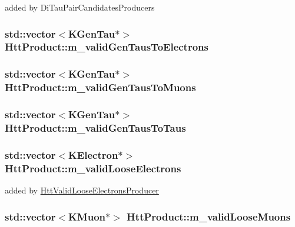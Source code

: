 added by DiTauPairCandidatesProducers \hypertarget{classHttProduct_a9b4abe266732576c4acebde25b49a9a0}{
\subsubsection[{m\_\-validGenTausToElectrons}]{\setlength{\rightskip}{0pt plus 5cm}std::vector$<$KGenTau$\ast$$>$ {\bf HttProduct::m\_\-validGenTausToElectrons}}}
\label{classHttProduct_a9b4abe266732576c4acebde25b49a9a0}
\hypertarget{classHttProduct_a0f0b0a177d96a0aaa051228061356033}{
\subsubsection[{m\_\-validGenTausToMuons}]{\setlength{\rightskip}{0pt plus 5cm}std::vector$<$KGenTau$\ast$$>$ {\bf HttProduct::m\_\-validGenTausToMuons}}}
\label{classHttProduct_a0f0b0a177d96a0aaa051228061356033}
\hypertarget{classHttProduct_abd8f9838618318dde76c1c98b6d00e0d}{
\subsubsection[{m\_\-validGenTausToTaus}]{\setlength{\rightskip}{0pt plus 5cm}std::vector$<$KGenTau$\ast$$>$ {\bf HttProduct::m\_\-validGenTausToTaus}}}
\label{classHttProduct_abd8f9838618318dde76c1c98b6d00e0d}
\hypertarget{classHttProduct_ac87470e7729b6905e0a309224834180c}{
\subsubsection[{m\_\-validLooseElectrons}]{\setlength{\rightskip}{0pt plus 5cm}std::vector$<$KElectron$\ast$$>$ {\bf HttProduct::m\_\-validLooseElectrons}}}
\label{classHttProduct_ac87470e7729b6905e0a309224834180c}


added by \hyperlink{classHttValidLooseElectronsProducer}{HttValidLooseElectronsProducer} \hypertarget{classHttProduct_a0d748a5f5c91b50ee29939c0b1ee23c1}{
\subsubsection[{m\_\-validLooseMuons}]{\setlength{\rightskip}{0pt plus 5cm}std::vector$<$KMuon$\ast$$>$ {\bf HttProduct::m\_\-validLooseMuons}}}
\label{classHttProduct_a0d748a5f5c91b50ee29939c0b1ee23c1}


